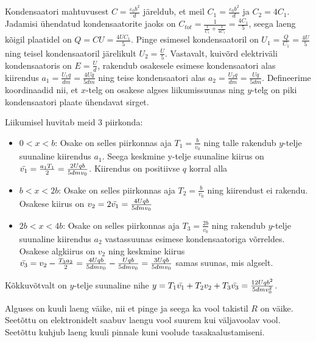 \documentclass[10pt]{article}
\begin{document}

\solu
Kondensaatori mahtuvusest $C = \frac{\varepsilon_0 b^2}{d}$ järeldub, et meil $C_1 = \frac{\varepsilon_0 b^2}{d}$ ja $C_2 = 4C_1$.
Jadamisi ühendatud kondensaatorite jaoks on $C_{tot} = \frac{1}{\frac{1}{C_1} + \frac{1}{4C_1}} = \frac{4C_1}{5}$, seega laeng kõigil plaatidel on $Q = CU = \frac{4UC_1}{5}$. Pinge esimesel kondensaatoril on $U_1 = \frac{Q}{C_1} = \frac{4U}{5}$ ning teisel kondensaatoril järelikult $U_2 = \frac{U}{5}$. Vastavalt, kuivõrd elektriväli kondensaatoris on $E=\frac{U}{d}$, rakendub osakesele esimese kondensaatori alas kiirendus $a_1 = \frac{U_1q}{dm} = \frac{4Uq}{5dm}$ ning teise kondensaatori alas $a_2 = \frac{U_2q}{dm} = \frac{Uq}{5dm}$.
Defineerime koordinaadid nii, et $x$-telg on osakese algses liikumissuunas ning $y$-telg on piki kondensaatori plaate ühendavat sirget.

Liikumisel huvitab meid 3 piirkonda:
\begin{itemize}
    \item $0 < x < b$: Osake on selles piirkonnas aja $T_1 = \frac{b}{v_0}$ ning talle rakendub $y$-telje suunaline kiirendus $a_1$. Seega keskmine y-telje suunaline kiirus on $\Bar{v_1}=\frac{a_1T_1}{2} = \frac{2Uqb}{5dmv_0}$. Kiirendus on positiivse $q$ korral alla
    \item $b<x<2b$: Osake on selles piirkonnas aja $T_2=\frac{b}{v_0}$ ning kiirendust ei rakendu. Osakese kiirus on $v_2 = 2\Bar{v_1} = \frac{4Uqb}{5dmv_0}$
    \item $2b<x<4b$: Osake on selles piirkonnas aja $T_3 = \frac{2b}{v_0}$ ning rakendub $y$-telje suunaline kiirendus $a_2$ vastassuunas esimese kondensaatoriga võrreldes. Osakese algkiirus on $v_2$ ning keskmine kiirus $\Bar{v_3} = v_2 - \frac{T_3a_2}{2} = \frac{4Uqb}{5dmv_0} - \frac{Uqb}{5dmv_0} = \frac{3Uqb}{5dmv_0}$ samas suunas, mis algselt.
\end{itemize}

Kõkkuvõtvalt on $y$-telje suunaline nihe $y = T_1\Bar{v_1} + T_2v_2 + T_3\Bar{v_3} = \frac{12Uqb^2}{5dmv_0^2}$.
\probend
\bigskip


\solu
Alguses on kuuli laeng väike, nii et pinge ja seega ka vool takistil $R$ on väike. Seetõttu on elektronidelt saabuv laengu vool suurem kui väljavoolav vool. Seetõttu kuhjub laeng kuuli pinnale kuni voolude tasakaalustamiseni.
\end{document}
